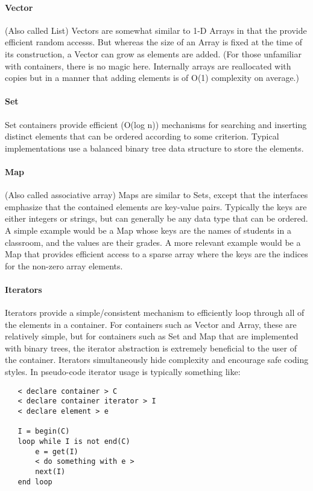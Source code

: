 \documentclass{article}
\begin{document}
\paragraph{Vector} (Also called List) Vectors are somewhat similar to 1-D Arrays in that the provide efficient random accesss.  But whereas the size of an Array is fixed at the time of its construction, a Vector can grow as elements are added.  (For those unfamiliar with containers, there is no magic here.  Internally arrays are reallocated with copies but in a manner that adding elements is of O(1)      complexity on average.)

\paragraph{Set} Set containers provide efficient (O(log n)) mechanisms for searching and inserting distinct elements that can be ordered according to some criterion.  Typical implementations use a balanced binary tree data structure to store the elements.

\paragraph{Map} (Also called associative array) Maps are similar to Sets, except that the interfaces emphasize that the contained elements are key-value pairs.  Typically the keys are either integers or strings, but can generally be any      data type that can be ordered.  A simple example would be a Map whose keys are the names of students in a classroom, and the values are their grades.  A more relevant example would be a Map that provides efficient access to a sparse array where the keys are the indices for the non-zero array elements.

\paragraph{Iterators}  Iterators provide a simple/consistent mechanism to efficiently loop through all of the elements in a container.  For   containers such as Vector and Array, these are relatively simple, but for containers such as Set and Map that are implemented with binary trees, the iterator abstraction is extremely beneficial to the user of the container.  Iterators simultaneously hide complexity and encourage safe coding styles.  In pseudo-code iterator
   usage is typically something like:

\begin{lstlisting}
   < declare container > C
   < declare container iterator > I
   < declare element > e

   I = begin(C)
   loop while I is not end(C)
       e = get(I)
       < do something with e >
       next(I)
   end loop
\end{lstlisting}    
\end{document}
